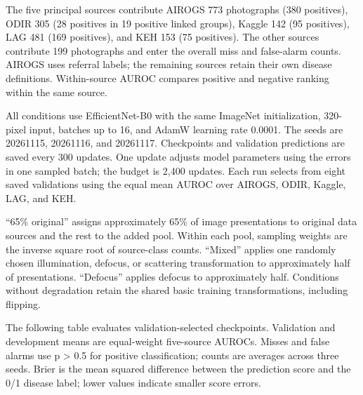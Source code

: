 \documentclass[
  10pt,
]{article}
\begin{document}
The five principal sources contribute AIROGS 773 photographs (380
positives), ODIR 305 (28 positives in 19 positive linked groups), Kaggle
142 (95 positives), LAG 481 (169 positives), and KEH 153 (75 positives).
The other sources contribute 199 photographs and enter the overall miss
and false-alarm counts. AIROGS uses referral labels; the remaining
sources retain their own disease definitions. Within-source AUROC
compares positive and negative ranking within the same source.

All conditions use EfficientNet-B0 with the same ImageNet
initialization, 320-pixel input, batches up to 16, and AdamW learning
rate 0.0001. The seeds are 20261115, 20261116, and 20261117. Checkpoints
and validation predictions are saved every 300 updates. One update
adjusts model parameters using the errors in one sampled batch; the
budget is 2,400 updates. Each run selects from eight saved validations
using the equal mean AUROC over AIROGS, ODIR, Kaggle, LAG, and KEH.

``65\% original'' assigns approximately 65\% of image presentations to
original data sources and the rest to the added pool. Within each pool,
sampling weights are the inverse square root of source-class counts.
``Mixed'' applies one randomly chosen illumination, defocus, or
scattering transformation to approximately half of presentations.
``Defocus'' applies defocus to approximately half. Conditions without
degradation retain the shared basic training transformations, including
flipping.

The following table evaluates validation-selected checkpoints.
Validation and development means are equal-weight five-source AUROCs.
Misses and false alarms use p \textgreater{} 0.5 for positive
classification; counts are averages across three seeds. Brier is the
mean squared difference between the prediction score and the 0/1 disease
label; lower values indicate smaller score errors.
\end{document}
